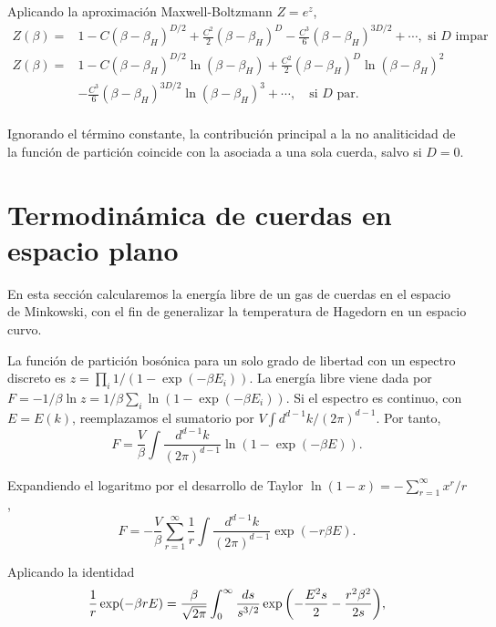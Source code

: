 Aplicando la aproximación Maxwell-Boltzmann $Z=e^z$,
\begin{equation}
  \begin{aligned}
   Z(\beta)= &1-C(\beta-\beta_H)^{D/2} +\frac{C^2}{2}(\beta-\beta_H)^D-\frac{C^3}{6}(\beta-\beta_H)^{3D/2}+\cdots, \text{ si $D$ impar}\\
   Z(\beta)= &1-C(\beta-\beta_H)^{D/2}\ln(\beta-\beta_H) +\frac{C^2}{2}(\beta-\beta_H)^D\ln(\beta-\beta_H) ^2\\
         &-\frac{C^3}{6}(\beta-\beta_H)^{3D/2}\ln(\beta-\beta_H)^3 +\cdots, \quad \text{si $D$ par}.\\
  \end{aligned}
\end{equation}

Ignorando el término constante, la contribución principal a la no analiticidad de la función de partición coincide
con la asociada a una sola cuerda, salvo si $D=0$.


\section{Termodinámica de cuerdas en espacio plano}

\label{sec:free}

En esta sección calcularemos la energía libre de un gas de cuerdas en el espacio de Minkowski,
con el fin de generalizar la temperatura de Hagedorn en un espacio curvo.

La función de partición bosónica para un solo grado de libertad con un espectro discreto es $z=\prod_i 1/(1-\exp(-\beta E_i))$.
La energía libre viene dada por $F=-1/\beta \ln z=1/\beta\sum_i \ln(1-\exp(-\beta E_i))$.
Si el espectro es continuo, con $E=E(k)$, reemplazamos el sumatorio por $V\int d^{d-1}k/(2\pi)^{d-1}$. Por tanto,
\begin{equation}
  F=\frac{V}{\beta}\int \frac{d^{d-1}k}{(2\pi)^{d-1}}\ln(1-\exp(-\beta E)).
\end{equation}

Expandiendo el logaritmo por el desarrollo de Taylor $\ln(1-x)=-\sum^\infty_{r=1} x^r/r$,
\begin{equation}
  F=-\frac{V}{\beta}\sum^\infty_{r=1} \frac 1 r\int \frac{d^{d-1}k}{(2\pi)^{d-1}}\exp(-r\beta E).
\end{equation}

Aplicando la identidad
\begin{equation}
  \frac 1 r \exp(-\beta r E)=\frac{\beta}{\sqrt{2\pi}}\int_0^\infty \frac{ds}{s^{3/2}}\exp\qty(-\frac{E^2s}{2}-\frac{r^2\beta^2}{2s}),
\end{equation}

